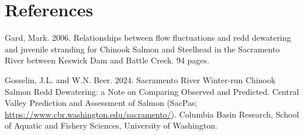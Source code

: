 \documentclass[
]{article}
\begin{document}
\hypertarget{references}{%
\section{References}\label{references}}

Gard, Mark. 2006. Relationships between flow fluctuations and redd
dewatering and juvenile stranding for Chinook Salmon and Steelhead in
the Sacramento River between Keswick Dam and Battle Creek. 94 pages.

Gosselin, J.L. and W.N. Beer. 2024. Sacramento River Winter-run Chinook
Salmon Redd Dewatering: a Note on Comparing Observed and Predicted.
Central Valley Prediction and Assessment of Salmon (SacPas;
\url{https://www.cbr.washington.edu/sacramento/}). Columbia Basin
Research, School of Aquatic and Fishery Sciences, University of
Washington.
\end{document}
